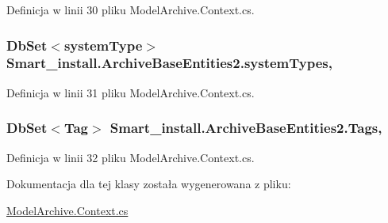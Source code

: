 Definicja w linii 30 pliku Model\+Archive.\+Context.\+cs.

\hypertarget{class_smart__install_1_1_archive_base_entities2_a2d740959abb28124acc90d6a8eb4fdd9}{
\subsubsection[{system\+Types}]{\setlength{\rightskip}{0pt plus 5cm}Db\+Set$<${\bf system\+Type}$>$ Smart\+\_\+install.\+Archive\+Base\+Entities2.\+system\+Types\hspace{0.3cm}{\ttfamily [get]}, {\ttfamily [set]}}}\label{class_smart__install_1_1_archive_base_entities2_a2d740959abb28124acc90d6a8eb4fdd9}


Definicja w linii 31 pliku Model\+Archive.\+Context.\+cs.

\hypertarget{class_smart__install_1_1_archive_base_entities2_aec8c3eec718e967babe00f42e4988996}{
\subsubsection[{Tags}]{\setlength{\rightskip}{0pt plus 5cm}Db\+Set$<${\bf Tag}$>$ Smart\+\_\+install.\+Archive\+Base\+Entities2.\+Tags\hspace{0.3cm}{\ttfamily [get]}, {\ttfamily [set]}}}\label{class_smart__install_1_1_archive_base_entities2_aec8c3eec718e967babe00f42e4988996}


Definicja w linii 32 pliku Model\+Archive.\+Context.\+cs.



Dokumentacja dla tej klasy została wygenerowana z pliku\+:\begin{DoxyCompactItemize}
\item 
\hyperlink{_model_archive_8_context_8cs}{Model\+Archive.\+Context.\+cs}\end{DoxyCompactItemize}

